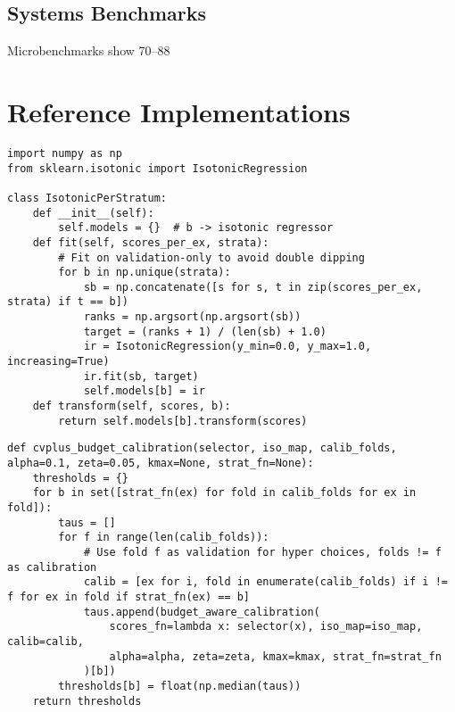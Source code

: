 \documentclass[11pt]{article}
\begin{document}
\subsection{Systems Benchmarks}
Microbenchmarks show 70–88%

\section{Reference Implementations}
\begin{lstlisting}[style=py, caption={Per-stratum isotonic uniformization (validation only).}]
import numpy as np
from sklearn.isotonic import IsotonicRegression

class IsotonicPerStratum:
    def __init__(self):
        self.models = {}  # b -> isotonic regressor
    def fit(self, scores_per_ex, strata):
        # Fit on validation-only to avoid double dipping
        for b in np.unique(strata):
            sb = np.concatenate([s for s, t in zip(scores_per_ex, strata) if t == b])
            ranks = np.argsort(np.argsort(sb))
            target = (ranks + 1) / (len(sb) + 1.0)
            ir = IsotonicRegression(y_min=0.0, y_max=1.0, increasing=True)
            ir.fit(sb, target)
            self.models[b] = ir
    def transform(self, scores, b):
        return self.models[b].transform(scores)
\end{lstlisting}

\begin{lstlisting}[style=py, caption={Conditional/Mondrian conformal calibration with CV+ and budget constraint.}]
def cvplus_budget_calibration(selector, iso_map, calib_folds, alpha=0.1, zeta=0.05, kmax=None, strat_fn=None):
    thresholds = {}
    for b in set([strat_fn(ex) for fold in calib_folds for ex in fold]):
        taus = []
        for f in range(len(calib_folds)):
            # Use fold f as validation for hyper choices, folds != f as calibration
            calib = [ex for i, fold in enumerate(calib_folds) if i != f for ex in fold if strat_fn(ex) == b]
            taus.append(budget_aware_calibration(
                scores_fn=lambda x: selector(x), iso_map=iso_map, calib=calib,
                alpha=alpha, zeta=zeta, kmax=kmax, strat_fn=strat_fn
            )[b])
        thresholds[b] = float(np.median(taus))
    return thresholds
\end{lstlisting}
\end{document}
